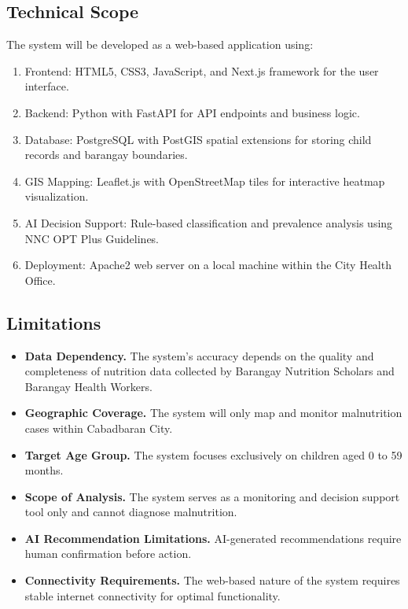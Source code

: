 \documentclass[12pt, a4paper]{report}
\begin{document}
\subsection{Technical Scope}
The system will be developed as a web-based application using:
\begin{enumerate}
    \item Frontend: HTML5, CSS3, JavaScript, and Next.js framework for the user interface.
    \item Backend: Python with FastAPI for API endpoints and business logic.
    \item Database: PostgreSQL with PostGIS spatial extensions for storing child records and barangay boundaries.
    \item GIS Mapping: Leaflet.js with OpenStreetMap tiles for interactive heatmap visualization.
    \item AI Decision Support: Rule-based classification and prevalence analysis using NNC OPT Plus Guidelines.
    \item Deployment: Apache2 web server on a local machine within the City Health Office.
\end{enumerate}

\subsection{Limitations}
\begin{itemize}
    \item \textbf{Data Dependency.} The system's accuracy depends on the quality and completeness of nutrition data collected by Barangay Nutrition Scholars and Barangay Health Workers.
    \item \textbf{Geographic Coverage.} The system will only map and monitor malnutrition cases within Cabadbaran City.
    \item \textbf{Target Age Group.} The system focuses exclusively on children aged 0 to 59 months.
    \item \textbf{Scope of Analysis.} The system serves as a monitoring and decision support tool only and cannot diagnose malnutrition.
    \item \textbf{AI Recommendation Limitations.} AI-generated recommendations require human confirmation before action.
    \item \textbf{Connectivity Requirements.} The web-based nature of the system requires stable internet connectivity for optimal functionality.
\end{itemize}
\end{document}
